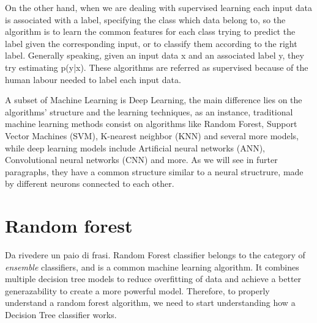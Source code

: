 \documentclass[11pt]{report}
\begin{document}

On the other hand, when we are dealing with supervised learning each input data is associated with a label, specifying the class which data belong to, so the algorithm is to learn the common features for each class trying to predict the label given the corresponding input, or to classify them according to the right label.
Generally speaking, given an input data x and an associated label y, they try estimating p(y|x). These algorithms are referred as supervised because of the human labour needed to label each input data.

A subset of Machine Learning is Deep Learning, the main difference lies on the algorithms' structure and the learning techniques, as an instance, traditional machine learning methods consist on algorithms like Random Forest, Support Vector Machines (SVM), K-nearest neighbor (KNN) and several more models, while deep learning models include Artificial neural networks (ANN), Convolutional neural networks (CNN) and more.
As we will see in furter paragraphs, they have a common structure similar to a neural structrure, made by different neurons connected to each other.




\section{Random forest}
Da rivedere un paio di frasi.
Random Forest classifier belongs to the category of \emph{ensemble} classifiers, and is a common machine learning algorithm.
It combines multiple decision tree models to reduce overfitting of data and achieve a better generazability to create a more powerful model.
Therefore, to properly understand a random forest algorithm, we need to start understanding how a Decision Tree classifier works.
\end{document}
